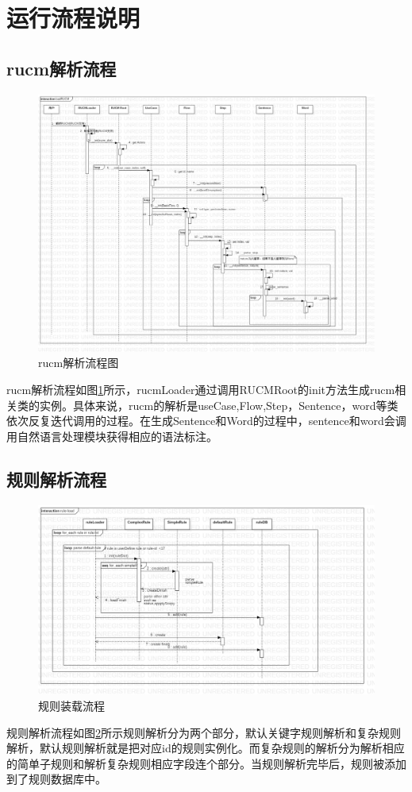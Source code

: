 \section{运行流程说明}
\subsection{rucm解析流程}
   	\begin{figure}
	\centering
	\includegraphics[width=1\textwidth]{./src/sequence_loadRUCM.jpg} 
	\caption{rucm解析流程图} 
	\label{sequence_loadRUCM}
	\end{figure}
	rucm解析流程如图\ref{sequence_loadRUCM}所示，rucmLoader通过调用RUCMRoot的init方法生成rucm相关类的实例。具体来说，rucm的解析是useCase,Flow,Step，Sentence，word等类依次反复迭代调用的过程。在生成Sentence和Word的过程中，sentence和word会调用自然语言处理模块获得相应的语法标注。

\subsection{规则解析流程}
   	\begin{figure}
	\centering
	\includegraphics[width=1\textwidth]{./src/sequence_ruleLoad.jpg} 
	\caption{规则装载流程}
	\label{sequence_ruleLoad}
\end{figure}
	规则解析流程如图\ref{sequence_ruleLoad}所示规则解析分为两个部分，默认关键字规则解析和复杂规则解析，默认规则解析就是把对应id的规则实例化。而复杂规则的解析分为解析相应的简单子规则和解析复杂规则相应字段连个部分。当规则解析完毕后，规则被添加到了规则数据库中。
